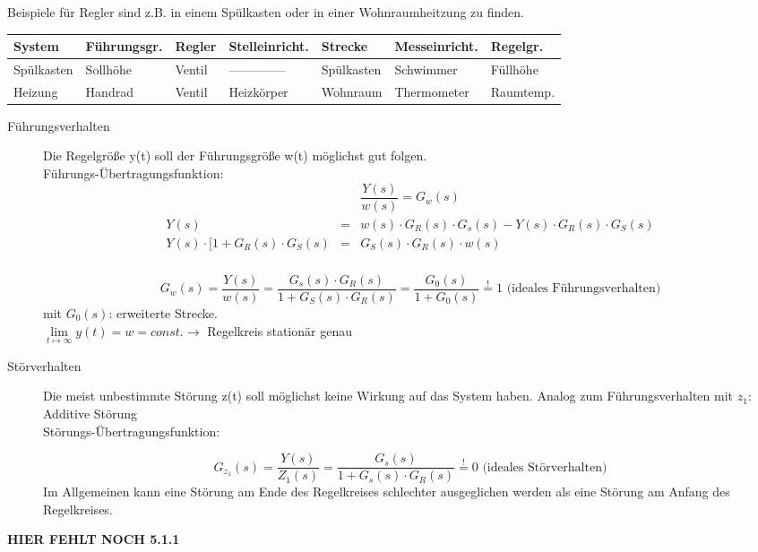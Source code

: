\message{ !name(Mitschrieb_SysRegel.tex)}\documentclass[12pt,a4paper,ngerman]{scrartcl}
\begin{document}
Beispiele für Regler sind z.B. in einem Spülkasten  oder in einer Wohnraumheitzung zu finden.
\begin{table}[H]
  \centering
  \begin{tabular}{|l||l|l|l|l|l|l|}
\hline    
 System&Führungsgr.&Regler&Stelleinricht.&Strecke&Messeinricht.&Regelgr.\\
\hline
\hline
Spülkasten&Sollhöhe&Ventil&--------------&Spülkasten&Schwimmer&Füllhöhe\\
\hline
Heizung&Handrad&Ventil&Heizkörper&Wohnraum&Thermometer&Raumtemp.\\
\hline
  \end{tabular}
\end{table}
\begin{description}
\item[Führungsverhalten] Die Regelgröße y(t) soll der Führungsgröße w(t) möglichst gut folgen. \\
Führungs-Übertragungsfunktion:
\[
\frac{Y(s)}{w(s)}=G_w(s)
\]
\begin{align*}
  \begin{array}{lll}
    Y(s)&=&w(s)\cdot G_R(s)\cdot G_s(s)-Y(s)\cdot G_R(s)\cdot G_S(s)\\
    Y(s)\cdot [1+G_R(s)\cdot G_S(s)&=&G_S(s)\cdot G_R(s)\cdot w(s)\\
  \end{array}
\end{align*}

\[G_w(s)=\frac{Y(s)}{w(s)}=\frac{G_s(s)\cdot G_R(s)}{1+G_S(s)\cdot G_R(s)}=\frac{G_0(s)}{1+G_0(s)}\stackrel{!}{=}1 \text{ (ideales Führungsverhalten)}
\]
mit $G_0(s)$: erweiterte Strecke.\\
$\lim\limits_{t\mapsto \infty}{y(t)}=w=const. \rightarrow $ Regelkreis stationär genau

\item[Störverhalten] Die meist unbestimmte Störung z(t) soll möglichst keine Wirkung auf das System haben. Analog zum Führungsverhalten mit $z_1$: Additive Störung\\
Störungs-Übertragungsfunktion:

\[
G_{z_1}(s)=\frac{Y(s)}{Z_1(s)}=\frac{G_s(s)}{1+G_s(s)\cdot G_R(s)}\stackrel{!}{=}0 \text{ (ideales Störverhalten)}
\]
Im Allgemeinen kann eine Störung am Ende des Regelkreises schlechter ausgeglichen werden als eine Störung am Anfang des Regelkreises.
\end{description}

\textbf{HIER FEHLT NOCH 5.1.1}
\end{document}
